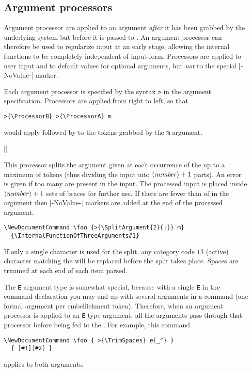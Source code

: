 \documentclass{ltxguide}
\begin{document}
\subsection{Argument processors}
\label{sec:cmd:processors}

Argument processor are applied to an argument \emph{after} it has been grabbed
by the underlying system but before it is passed to . An argument
processor can therefore be used to regularize input at an early stage, allowing
the internal functions to be completely independent of input form. Processors
are applied to user input and to default values for optional arguments, but
\emph{not} to the special |-NoValue-| marker.

Each argument processor is specified by the syntax \texttt{>}
in the argument specification. Processors are applied from right to left, so
that
\begin{verbatim}
>{\ProcessorB} >{\ProcessorA} m
\end{verbatim}
would apply  followed by  to the tokens grabbed
by the \texttt{m} argument.

\begin{decl}
  |\SplitArgument|  
\end{decl}
This processor splits the argument given at each occurrence of the
 up to a maximum of  tokens (thus
dividing the input into $\text{\meta{number}} + 1$ parts).
An error is given if too many  are present in the
input. The processed input is placed inside
$\text{\meta{number}} + 1$ sets of braces for further use.
If there are fewer than  of  in the argument
then |-NoValue-| markers are added at the end of the processed
argument.
\begin{verbatim}
\NewDocumentCommand \foo {>{\SplitArgument{2}{;}} m}
  {\InternalFunctionOfThreeArguments#1}
\end{verbatim}
If only a single character  is used for the split, any
category code $13$ (active) character matching the  will
be replaced before the split takes place.
Spaces are trimmed at each end of each item parsed.

The \texttt{E} argument type is somewhat special, because with a single
\texttt{E} in the command declaration you may end up with several
arguments in a command (one formal argument per embellishment token).
Therefore, when an argument processor is applied to an \texttt{E}-type
argument, all the arguments pass through that processor before being fed
to the .  For example, this command
\begin{verbatim}
\NewDocumentCommand \foo { >{\TrimSpaces} e{_^} }
  { [#1](#2) }
\end{verbatim}
applies  to both arguments.
\end{document}
